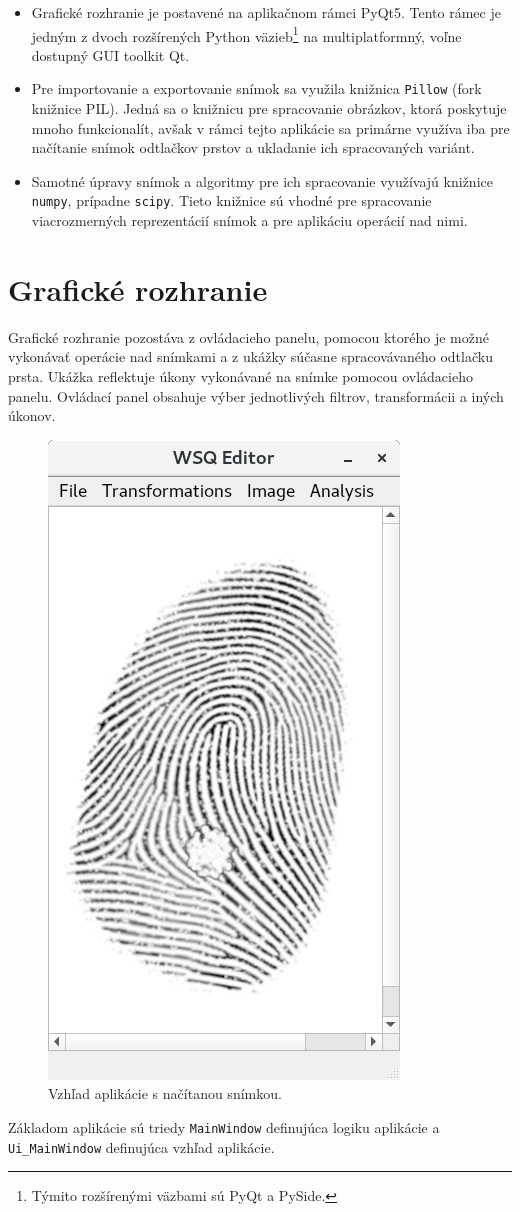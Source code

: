   \begin{itemize}
    \item Grafické rozhranie je postavené na aplikačnom rámci PyQt5. Tento rámec je jedným z dvoch rozšírených Python väzieb\footnote{Týmito rozšírenými
          väzbami sú PyQt a PySide.}
          na multiplatformný, voľne dostupný GUI toolkit Qt.
    \item Pre importovanie a exportovanie snímok sa využila knižnica \texttt{Pillow} (fork knižnice PIL). Jedná sa o knižnicu pre spracovanie obrázkov,
          ktorá poskytuje mnoho funkcionalít, avšak v rámci tejto aplikácie sa primárne využíva iba pre načítanie snímok odtlačkov prstov a ukladanie
          ich spracovaných variánt.
    \item Samotné úpravy snímok a algoritmy pre ich spracovanie využívajú knižnice \texttt{numpy}, prípadne \texttt{scipy}. Tieto knižnice sú vhodné pre
          spracovanie viacrozmerných reprezentácií snímok a pre aplikáciu operácií nad nimi.
  \end{itemize}

  \section{Grafické rozhranie}
  Grafické rozhranie pozostáva z ovládacieho panelu, pomocou ktorého je možné vykonávať operácie nad snímkami a z ukážky súčasne
  spracovávaného odtlačku prsta. Ukážka reflektuje úkony vykonávané na snímke pomocou ovládacieho panelu. Ovládací panel obsahuje výber jednotlivých filtrov,
  transformácii a iných úkonov.
  \begin{figure}[h]
    \centering
    \includegraphics[width=0.4\linewidth]{obrazky-figures/app.png}
    \caption{Vzhľad aplikácie s načítanou snímkou.}
    \label{obr:app}
  \end{figure}
  Základom aplikácie sú triedy \texttt{MainWindow} definujúca logiku aplikácie a \texttt{Ui\_MainWindow} definujúca vzhľad aplikácie.

